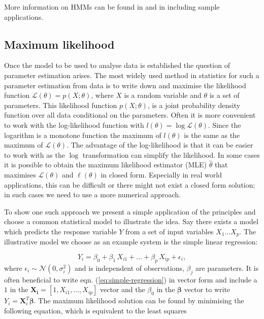 More information on HMMs can be found in \cite{MacDonald:1997wm} and in \cite{Zucchini:2009vl} including sample applications.


\subsection{Maximum likelihood}
\label{sec:least-squares}

Once the model to be used to analyse data is established the question of parameter estimation arises. The most widely used method in statistics for such a parameter estimation from data is  to write down and maximise the likelihood function $ \mathcal{L}(\theta) = p(X; \theta) $, where $X$ is a random variable and $\theta$ is a set of parameters. This likelihood function $p(X;\theta)$, is a joint probability density function over all data conditional on the parameters.  Often it is more convenient to work with the log-likelihood function with $l(\theta) = \log \mathcal{L}(\theta)$. Since the logarithm is a monotone function the maximum of $l (\theta)$ is the same as the maximum of $\mathcal{L} (\theta)$. The advantage of the log-likelihood is that it can be easier to work with as the $\log$ transformation can simplify the likelihood. In some cases it is possible to obtain the maximum likelihood estimator (MLE) $\hat{\theta}$ that maximises $\mathcal{L}(\theta)$ and $\ell (\theta)$ in closed form. Especially in real world applications, this can be difficult or there might not exist a closed form solution; in such cases we need to use a more numerical approach.

To show one such approach we present a simple application of the principles and choose a common statistical model to illustrate the idea. Say there exists a model which predicts the response variable $Y$ from a set of input variables $X_1 \ldots X_p$. The illustrative model we choose as an example system is the simple linear regression:

\begin{equation}
  \label{eq:simple-regression}
  Y_i = \beta_0 + \beta_1 \, X_{i1}  + \ldots +\beta_p \, X_{ip}+ \epsilon_i,
\end{equation}
where $\epsilon_i \sim \mathcal{N}(0, \sigma_i^2)$ and is independent of observations, $\beta_j$ are parameters. It is often beneficial to write eqn. (\ref{eq:simple-regression}) in vector form and include a $1$ in the $\mathbf{X_{i}} = [1, X_{i1}, \ldots , X_{ip}]$ vector and the $\beta_0$ in the $\mathbf{\beta}$ vector to write $Y_i = \mathbf{X}_i^T \mathbf{\beta}$. The maximum likelihood solution can be found by minimising the following equation, which is equivalent to the least squares

